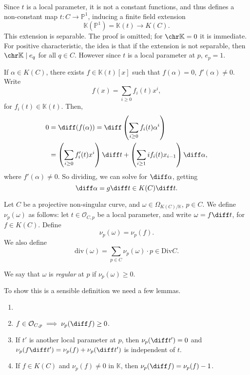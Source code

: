 \documentclass[12pt]{article}
\begin{document}
\begin{proofbox}
	Since $t$ is a local parameter, it is not a constant functions, and thus defines a non-constant map $t : C \to \mathbb{P}^1$, inducing a finite field extension
	\[
	\mathbb{K}(\mathbb{P}^1) = \mathbb{K}(t) \to K(C).
	\]
	This extension is separable. The proof is omitted; for $\chr \mathbb{K} = 0$ it is immediate. For positive characteristic, the idea is that if the extension is not separable, then $\chr \mathbb{K} \mid e_q$ for all $q \in C$. However since $t$ is a local parameter at $p$, $e_p = 1$.

	If $\alpha \in K(C)$, there exists $f \in \mathbb{K}(t)[x]$ such that $f(\alpha) = 0$, $f'(\alpha) \neq 0$. Write
	\[
	f(x) = \sum_{i \geq 0}f_i(t) x^i,
	\]
	for $f_i(t) \in \mathbb{K}(t)$. Then,
	\begin{align*}
		0 &= \diff (f(\alpha)) = \diff \left( \sum_{i \geq 0} f_i(t) \alpha^i \right) \\
		  &= \left( \sum_{i \geq 0} f_i'(t) x^i \right) \diff t + \left( \sum_{ i \geq 1} i f_i(t) x_{i-1} \right) \diff \alpha,
	\end{align*}
	where $f'(\alpha) \neq 0$. So dividing, we can solve for $\diff \alpha$, getting
	\[
	\diff \alpha = g \diff t \in K(C) \diff t.
	\]
\end{proofbox}

\begin{definition}
	Let $C$ be a projective non-singular curve, and $\omega \in \Omega_{K(C)/\mathbb{K}}$, $p \in C$. We define $\nu_p(\omega)$ as follows: let $t \in \mathcal{O}_{C, p}$ be a local parameter, and write $\omega = f \diff t$, for $f \in K(C)$. Define
	\[
	\nu_p(\omega) = \nu_p(f).
	\]
	We also define
	\[
	\mathrm{div} (\omega) = \sum_{p \in C} \nu_p(\omega) \cdot p \in \mathrm{Div}C.
	\]
\end{definition}

We say that $\omega$ is \emph{regular} at $p$ if $\nu_p(\omega) \geq 0$.

To show this is a sensible definition we need a few lemmas.

\begin{lemma}
	\begin{enumerate}[\normalfont(i)]
		\item[]
		\item $f \in \mathcal{O}_{C, p} \implies \nu_p(\diff f) \geq 0$.
		\item If $t'$ is another local parameter at $p$, then $\nu_p(\diff t') = 0$ and $\nu_p(f \diff t') = \nu_p(f) + \nu_p(\diff t')$ is independent of $t$.
		\item If $f \in K(C)$ and $\nu_p(f) \neq 0$ in $\mathbb{K}$, then $\nu_p(\diff f) = \nu_p(f) - 1$.
	\end{enumerate}
\end{lemma}
\end{document}
